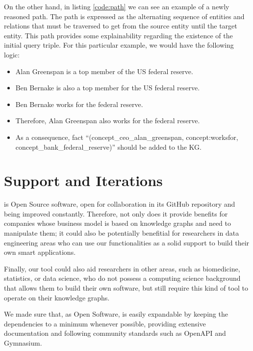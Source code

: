On the other hand, in listing \ref{code:path} we can see an example of a newly reasoned path. The path is expressed as the alternating sequence of entities and relations that must be traversed to get from the source entity until the target entity. This path provides some explainability regarding the existence of the initial query triple. For this particular example, we would have the following logic:

\begin{itemize}
    \item Alan Greenspan is a top member of the US federal reserve.
    \item Ben Bernake is also a top member for the US federal reserve.
    \item Ben Bernake works for the federal reserve.
    \item Therefore, Alan Greenspan also works for the federal reserve.
    \item As a consequence, fact ``(concept\_ceo\_alan\_greenspan, concept:worksfor,\\  concept\_bank\_federal\_reserve)'' should be added to the KG.
\end{itemize}

\section{Support and Iterations}

\toolname{} is Open Source software, open for collaboration in its GitHub repository \cite{SpaceRL} and being improved constantly. Therefore, not only does it provide benefits for companies whose business model is based on knowledge graphs and need to manipulate them; it could also be potentially benefitial for researchers in data engineering areas who can use our functionalities as a solid support to build their own smart applications.

Finally, our tool could also aid researchers in other areas, such as biomedicine, statistics, or data science, who do not possess a computing science background that allows them to build their own software, but still require this kind of tool to operate on their knowledge graphs.


We made sure that, as Open Software, \toolname{} is easily expandable by keeping the dependencies to a minimum whenever possible, providing extensive documentation and following community standards such as OpenAPI and Gymnasium.

